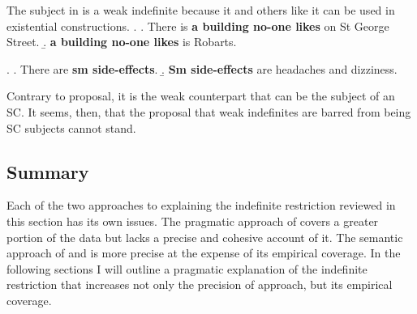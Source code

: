 \documentclass[GPFinal]{subfiles}
\begin{document}
The subject in \Last[b] is a weak indefinite because it and others like it can be used in existential constructions.
\ex. 
\a. There is \textbf{a building no-one likes} on St George Street.
\b. \textbf{a building no-one likes} is Robarts.

\ex.
\a. There are \textbf{sm side-effects}.
\b. \textbf{Sm side-effects} are headaches and dizziness. 

Contrary to  proposal, it is the weak counterpart that can be the subject of an SC.
It seems, then, that the proposal that weak indefinites are barred from being SC subjects cannot stand.

\subsection{Summary}
Each of the two approaches to explaining the indefinite restriction reviewed in this section has its own issues.
The pragmatic approach of \textcite{mikkelsen2004specifying} covers a greater portion of the data but lacks a precise and cohesive account of it.
The semantic approach of \textcite{heycockkroch1999pseudocleft} and \textcite{heycock2012specification} is more precise at the expense of its empirical coverage.
In the following sections I will outline a pragmatic explanation of the indefinite restriction that increases not only the precision of  approach, but its empirical coverage.
\end{document}
